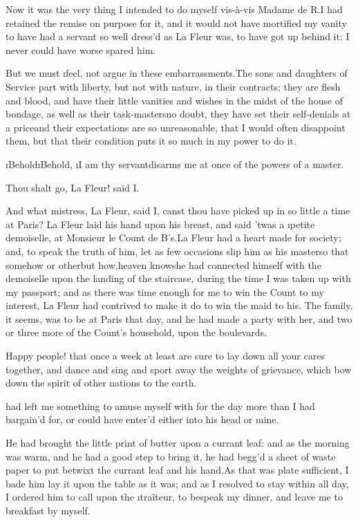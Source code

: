 \documentclass[twoside]{article}
\begin{document}
Now it was the very thing I intended to do
myself vis-à-vis Madame de R\tskk .\tskk I
had retained the remise on purpose for it,
and it would not have mortified my vanity
to have had a servant so well dress’d as
La Fleur was, to have got up behind it: I
never could have worse spared him.

But we must \i{feel}, not argue in these
embarrassments.\tskk The sons and
daughters of Service part with liberty,
but not with nature, in their contracts;
they are flesh and blood, and have their
little vanities and wishes in the midst of
the house of bondage, as well as their
task-masters\tskk no doubt, they have set
their self-denials at a price\tskk and
their expectations are so unreasonable,
that I would often disappoint them, but
that their condition puts it so much in my
power to do it.

\i{Behold}\tskk \i{Behold}, \i{I am thy
servant}\tskk disarms me at once of the
powers of a master.\tskk 

Thou shalt go, La Fleur! said I.

\tskk And what mistress, La Fleur, said I,
canst thou have picked up in so little a
time at Paris?  La Fleur laid his hand
upon his breast, and said ’twas a
\i{petite demoiselle}, at Monsieur le
Count de B\anon’s.\tskk La Fleur had a
heart made for society; and, to speak the
truth of him, let as few occasions slip
him as his master\tskk so that somehow or
other\tskk but how,\tskk heaven
knows\tskk he had connected himself with
the demoiselle upon the landing of the
staircase, during the time I was taken up
with my passport; and as there was time
enough for me to win the Count to my
interest, La Fleur had contrived to make
it do to win the maid to his.  The family,
it seems, was to be at Paris that day, and
he had made a party with her, and two or
three more of the Count’s household, upon
the boulevards.

Happy people! that once a week at least
are sure to lay down all your cares
together, and dance and sing and sport
away the weights of grievance, which bow
down the spirit of other nations to the
earth.





\vskip 6pt


 had left me something
to amuse myself with for the day more than
I had bargain’d for, or could have enter’d
either into his head or mine.

He had brought the little print of butter
upon a currant leaf: and as the morning
was warm, and he had a good step to bring
it, he had begg’d a sheet of waste paper
to put betwixt the currant leaf and his
hand.\tskk As that was plate sufficient, I
bade him lay it upon the table as it was;
and as I resolved to stay within all day,
I ordered him to call upon the
\i{traîteur}, to bespeak my dinner, and
leave me to breakfast by myself.
\end{document}
